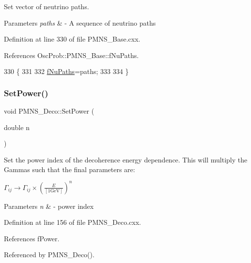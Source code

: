 Set vector of neutrino paths. 
\begin{DoxyParams}{Parameters}
{\em paths} & -\/ A sequence of neutrino paths \\
\hline
\end{DoxyParams}


Definition at line 330 of file P\+M\+N\+S\+\_\+\+Base.\+cxx.



References Osc\+Prob\+::\+P\+M\+N\+S\+\_\+\+Base\+::f\+Nu\+Paths.


\begin{DoxyCode}
330                                               \{
331 
332   \hyperlink{classOscProb_1_1PMNS__Base_a69db9d57e12fc7cbe0431bc6c18fac93}{fNuPaths}=paths;
333 
334 \}
\end{DoxyCode}
\mbox{\label{classOscProb_1_1PMNS__Deco_afe7b8b9ae438d8b207bf75c2cfbb9fb8}} 
\subsubsection{\texorpdfstring{Set\+Power()}{SetPower()}}
{\footnotesize\ttfamily void P\+M\+N\+S\+\_\+\+Deco\+::\+Set\+Power (\begin{DoxyParamCaption}\item[{double}]{n }\end{DoxyParamCaption})\hspace{0.3cm}{\ttfamily [virtual]}}

Set the power index of the decoherence energy dependence. This will multiply the Gammas such that the final parameters are\+:

$ \Gamma_{ij} \rightarrow \Gamma_{ij} \times \left(\frac{E}{[1 \mbox{GeV}]}\right)^n $


\begin{DoxyParams}{Parameters}
{\em n} & -\/ power index \\
\hline
\end{DoxyParams}


Definition at line 156 of file P\+M\+N\+S\+\_\+\+Deco.\+cxx.



References f\+Power.



Referenced by P\+M\+N\+S\+\_\+\+Deco().


